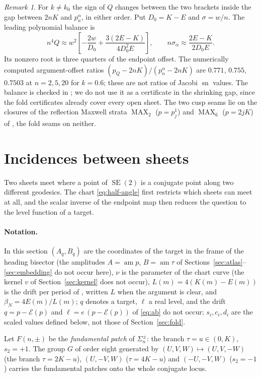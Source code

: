 \documentclass[11pt]{article}
\theoremstyle{remark}
\newtheorem{remark}[theorem]{Remark}
\newcommand{\SE}{\operatorname{SE}(2)}
\newcommand{\sn}{\operatorname{sn}}
\newcommand{\am}{\operatorname{am}}
\newcommand{\epsi}{\mathcal{E}}
\begin{document}
\begin{remark}
For $k\ne k_0$ the sign of $Q$ changes between the two brackets inside
the gap between $2nK$ and $p_n^\alpha$, in either order.  Put
$D_0=K-E$ and $\sigma=w/n$.  The leading polynomial balance is
\[
 n^4Q\approx w^2\left[-\frac{2w}{D_0}
       +\frac{3(2E-K)}{4D_0^2E}\right],\qquad
 n\sigma_\alpha\approx\frac{2E-K}{2D_0E}.
\]
Its nonzero root is three quarters of the endpoint offset.  The
numerically computed argument-offset ratios
$(p_Q-2nK)/(p_n^\alpha-2nK)$ are $0.771$, $0.755$, $0.7503$
at $n=2,5,20$ for $k=0.6$; these are not ratios of Jacobi $\sn$ values.
The balance is checked in ;
we do not use it as a certificate in the shrinking gap, since the
fold certificates already cover every open sheet.
The two cusp seams lie on the closures of the reflection Maxwell strata
$\operatorname{MAX}_2$ ($p=p_j^1$) and $\operatorname{MAX}_6$ ($p=2jK$) of
\cite[Theorem 6.2]{MoiseevSachkov2010Maxwell}, the fold seams on neither.
\end{remark}

\section{Incidences between sheets}\label{sec:incidence}

Two sheets meet where a point of $\SE$ is a conjugate point along two
different geodesics.  The chart \eqref{eq:half-angle} first restricts
which sheets can meet at all, and the scalar inverse of the endpoint map
\cite{SE2Counts} then reduces the question to the level function of a
target.

\paragraph{Notation.}  In this section $(A_q,B_q)$ are the coordinates of
the target in the frame of the heading bisector (the amplitudes $A=\am p$,
$B=\am\tau$ of Sections~\ref{sec:atlas}--\ref{sec:embedding} do not occur
here), $\nu$ is the parameter of the chart curve (the kernel $v$ of
Section~\ref{sec:kernel} does not occur), $L(m)=4(K(m)-E(m))$ is the drift
per period of \cite{SE2Counts}, written $L$ when the argument is clear, and
$\beta_N=4E(m)/L(m)$; $q$ denotes a target, $\ell$ a real level, and the
drift $q=p-\epsi(p)$ and $\ell=e\,(p-\epsi(p))$ of \eqref{eq:ab} do not occur;
$s_i,c_i,d_i$ are the scaled values defined below, not those of
Section~\ref{sec:fold}.

Let $F(n,\pm)$ be the \emph{fundamental patch} of $\Sigma_n^\pm$: the
branch $\tau=u\in(0,K)$, $s_2=+1$.  The group $G$ of order eight generated
by $(U,V,W)\mapsto(U,V,-W)$ (the branch $\tau=2K-u$), $(U,-V,W)$
($\tau=4K-u$) and $(-U,-V,W)$ ($s_2=-1$) carries the fundamental patches
onto the whole conjugate locus.
\end{document}
